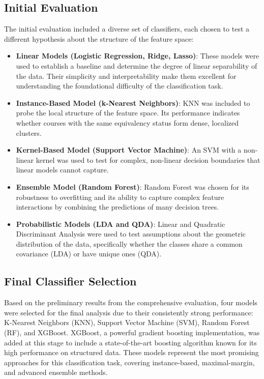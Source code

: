 \subsection{Initial Evaluation}
The initial evaluation included a diverse set of classifiers, each chosen to test a different hypothesis about the structure of the feature space:
\begin{itemize}
    \item \textbf{Linear Models (Logistic Regression, Ridge, Lasso)}: These models were used to establish a baseline and determine the degree of linear separability of the data. Their simplicity and interpretability make them excellent for understanding the foundational difficulty of the classification task. 
    \item \textbf{Instance-Based Model (k-Nearest Neighbors)}: KNN was included to probe the local structure of the feature space. Its performance indicates whether courses with the same equivalency status form dense, localized clusters.  
    \item \textbf{Kernel-Based Model (Support Vector Machine)}: An SVM with a non-linear kernel was used to test for complex, non-linear decision boundaries that linear models cannot capture.  
    \item \textbf{Ensemble Model (Random Forest)}: Random Forest was chosen for its robustness to overfitting and its ability to capture complex feature interactions by combining the predictions of many decision trees.  
    \item \textbf{Probabilistic Models (LDA and QDA)}: Linear and Quadratic Discriminant Analysis were used to test assumptions about the geometric distribution of the data, specifically whether the classes share a common covariance (LDA) or have unique ones (QDA).   
\end{itemize}

\subsection{Final Classifier Selection}
Based on the preliminary results from the comprehensive evaluation, four models were selected for the final analysis due to their consistently strong performance: K-Nearest Neighbors (KNN), Support Vector Machine (SVM), Random Forest (RF), and XGBoost. XGBoost, a powerful gradient boosting implementation, was added at this stage to include a state-of-the-art boosting algorithm known for its high performance on structured data. These models represent the most promising approaches for this classification task, covering instance-based, maximal-margin, and advanced ensemble methods.

